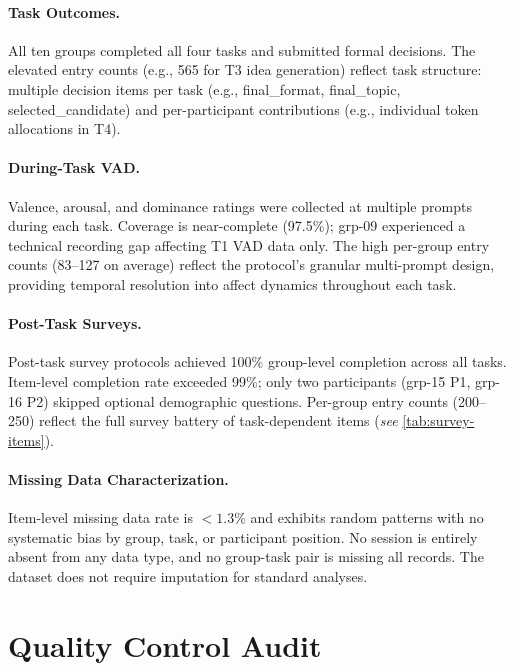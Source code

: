\documentclass[11pt,a4paper]{article}
\begin{document}
\paragraph{Task Outcomes.}
All ten groups completed all four tasks and submitted formal decisions.
The elevated entry counts (e.g., 565 for T3 idea generation) reflect task structure:
multiple decision items per task (e.g., final\_format, final\_topic, selected\_candidate)
and per-participant contributions (e.g., individual token allocations in T4).

\paragraph{During-Task VAD.}
Valence, arousal, and dominance ratings were collected at multiple prompts
during each task. Coverage is near-complete (97.5\%); grp-09 experienced a technical
recording gap affecting T1 VAD data only. The high per-group entry counts
(83–127 on average) reflect the protocol's granular multi-prompt design,
providing temporal resolution into affect dynamics throughout each task.

\paragraph{Post-Task Surveys.}
Post-task survey protocols achieved 100\% group-level completion across all tasks.
Item-level completion rate exceeded 99\%; only two participants (grp-15 P1, grp-16 P2)
skipped optional demographic questions. Per-group entry counts (200–250) reflect
the full survey battery of task-dependent items (\textit{see} \cref{tab:survey-items}).

\paragraph{Missing Data Characterization.}
Item-level missing data rate is $< 1.3\%$ and exhibits random patterns
with no systematic bias by group, task, or participant position.
No session is entirely absent from any data type, and no group-task pair is
missing all records. The dataset does not require imputation for standard analyses.

\section{Quality Control Audit}
\label{sec:qc-audit}
\end{document}
